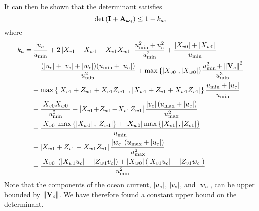 It can then be shown that the determinant satisfies
\begin{equation}
    \det\left(\mathbf{I} + \mathbf{A}_{\bm{\omega}_i}\right) \leq 1 - k_a,
\end{equation}
where
\begin{align}
    k_a = 
    &\, \frac{\abs{u_c}}{u_{\min}} + 2\abs{X_{v1} - X_{w1} - X_{v1}X_{w1}}\frac{u_{\min}^2 + u_c^2}{u_{\min}^2} + \frac{\abs{X_{v0}} + \abs{X_{w0}}}{u_{\min}} \nonumber \\
    & + \frac{\left(\abs{u_c} + \abs{v_c} + \abs{w_c}\right)\!\left(u_{\min} + \abs{u_c}\right)}{u_{\min}^2} + \max\left\{\abs{X_{v0}}\!, \abs{X_{w0}}\right\}\!\frac{u_{\min\!}^2 + \norm{\mat{V}_c}^2}{u_{\min}^3} \nonumber\\
    &+ \max\left\{\abs{X_{v1}+Z_{w1}+X_{v1}Z_{w1}}, \abs{X_{w1}+Z_{v1}+X_{w1}Z_{v1}}\right\}\frac{u_{\min} + \abs{u_c}}{u_{\min}} 
     \nonumber\\
    & + \frac{\abs{X_{v0}X_{w0}}}{u_{\min}^2}
    + \abs{X_{v1}\!+\!Z_{w1}\!-\!X_{v1}Z_{w1}}\frac{\abs{v_c}\left(u_{\max} + \abs{u_c}\right)}{u_{\max}^2} \nonumber \\
    & + \frac{\abs{X_{v0}}\max\left\{\abs{X_{w1}}, \abs{Z_{w1}}\right\} + \abs{X_{w0}}\max\left\{\abs{X_{v1}}, \abs{Z_{v1}}\right\}}{u_{\min}} \nonumber\\
    & + \abs{X_{w1}+Z_{v1}-X_{w1}Z_{v1}}\frac{\abs{w_c}\left(u_{\max} + \abs{u_c}\right)}{u_{\max}^2} \nonumber\\
    & + \frac{\abs{X_{v0}}\left(\abs{X_{w1}u_c}+\abs{Z_{w1}v_c}\right) + \abs{X_{w0}}\left(\abs{X_{v1}u_c}+\abs{Z_{v1}w_c}\right)}{u_{\min}^2}
\end{align}
Note that the components of the ocean current, $\left|u_c\right|$, $\left|v_c\right|$, and $\left|w_c\right|$, can be upper bounded by $\left\|\mathbf{V}_c\right\|$.
We have therefore found a constant upper bound on the determinant.

